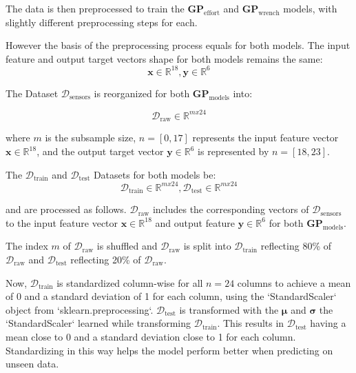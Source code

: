     The data is then preprocessed to train the \(\boldsymbol{GP}_{\text{effort}}\) and \(\boldsymbol{GP}_{\text{wrench}}\) models, with slightly different preprocessing steps for each.

    However the basis of the preprocessing process equals for both models. 
    The input feature and output target vectors shape for both models remains the same:
    \begin{equation}
    \boldsymbol{x} \in \mathbb{R}^{18} , \boldsymbol{y} \in \mathbb{R}^{6} 
    \label{eq:basis_input_output_vector}
    \end{equation}
    
    The Dataset \(\mathcal{D}_{\text{sensors}}\) is reorganized for both \(\boldsymbol{GP}_{\text{models}}\) into:

    \begin{equation}
    \mathcal{D}_{\text{raw}} \in \mathbb{R}^{mx24}
    \label{eq:D_raw}
    \end{equation}

    where \(m\) is the subsample size, \(n = [0, 17]\) represents the input feature vector \(\boldsymbol{x} \in \mathbb{R}^{18}\), and the output target vector \(\boldsymbol{y} \in \mathbb{R}^{6}\) is represented by \(n = [18, 23]\).

    The  \(\mathcal{D}_{\text{train}}\) and \(\mathcal{D}_{\text{test}}\) Datasets for both models be:
    \begin{equation}
    \mathcal{D}_{\text{train}} \in \mathbb{R}^{mx24} , \mathcal{D}_{\text{test}} \in \mathbb{R}^{mx24}
    \label{eq:train_test_data_shape}
    \end{equation}

    and are processed as follows.
    \(\mathcal{D}_{\text{raw}}\) includes the corresponding vectors of \(\mathcal{D}_{\text{sensors}}\) to the input feature vector \(\boldsymbol{x} \in \mathbb{R}^{18}\) and output feature \(\boldsymbol{y} \in \mathbb{R}^{6}\) for both \(\boldsymbol{GP}_{\text{models}}\).
    
    
    The index $m$ of \(\mathcal{D}_{\text{raw}}\) is shuffled and \(\mathcal{D}_{\text{raw}}\) is split into \(\mathcal{D}_{\text{train}}\) reflecting 80\% of \(\mathcal{D}_{\text{raw}}\) and \(\mathcal{D}_{\text{test}}\) reflecting 20\% of \(\mathcal{D}_{\text{raw}}\).

    Now, \(\mathcal{D}_{\text{train}}\) is standardized column-wise for all \(n = 24\) columns to achieve a mean of 0 and a standard deviation of 1 for each column, using the `StandardScaler` object from `sklearn.preprocessing`. \(\mathcal{D}_{\text{test}}\) is transformed with the \(\boldsymbol{\mu}\) and \(\boldsymbol{\sigma}\) the `StandardScaler` learned while transforming \(\mathcal{D}_{\text{train}}\). This results in \(\mathcal{D}_{\text{test}}\) having a mean close to 0 and a standard deviation close to 1 for each column. Standardizing in this way helps the model perform better when predicting on unseen data.
    \vspace{1em}

